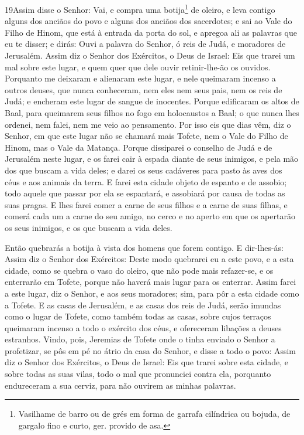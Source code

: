 \medskip

\lettrine{19} Assim disse o Senhor: Vai, e compra uma
botija\footnote{Vasilhame de barro ou de grés em forma de garrafa
cilíndrica ou bojuda, de gargalo fino e curto, ger. provido de asa.}
de oleiro, e leva contigo alguns dos anciãos do povo e alguns dos
anciãos dos sacerdotes; e sai ao Vale do Filho de Hinom, que
está à entrada da porta do sol, e apregoa ali as palavras que eu te
disser; e dirás: Ouvi a palavra do Senhor, ó reis de Judá, e
moradores de Jerusalém. Assim diz o Senhor dos Exércitos, o Deus de
Israel: Eis que trarei um mal sobre este lugar, e quem quer que dele
ouvir retinir-lhe-ão os ouvidos. Porquanto me deixaram e
alienaram este lugar, e nele queimaram incenso a outros deuses, que
nunca conheceram, nem eles nem seus pais, nem os reis de Judá; e
encheram este lugar de sangue de inocentes. Porque edificaram os
altos de Baal, para queimarem seus filhos no fogo em holocaustos a
Baal; o que nunca lhes ordenei, nem falei, nem me veio ao
pensamento. Por isso eis que dias vêm, diz o Senhor, em que este
lugar não se chamará mais Tofete, nem o Vale do Filho de Hinom, mas
o Vale da Matança. Porque dissiparei o conselho de Judá e de
Jerusalém neste lugar, e os farei cair à espada diante de seus
inimigos, e pela mão dos que buscam a vida deles; e darei os seus
cadáveres para pasto às aves dos céus e aos animais da terra. E
farei esta cidade objeto de espanto e de assobio; todo aquele que
passar por ela se espantará, e assobiará por causa de todas as suas
pragas. E lhes farei comer a carne de seus filhos e a carne de
suas filhas, e comerá cada um a carne do seu amigo, no cerco e no
aperto em que os apertarão os seus inimigos, e os que buscam a vida
deles.

Então quebrarás a botija à vista dos homens que forem contigo.
E dir-lhes-ás: Assim diz o Senhor dos Exércitos: Deste modo
quebrarei eu a este povo, e a esta cidade, como se quebra o vaso do
oleiro, que não pode mais refazer-se, e os enterrarão em Tofete,
porque não haverá mais lugar para os enterrar. Assim farei a
este lugar, diz o Senhor, e aos seus moradores; sim, para pôr a esta
cidade como a Tofete. E as casas de Jerusalém, e as casas dos
reis de Judá, serão imundas como o lugar de Tofete, como também
todas as casas, sobre cujos terraços queimaram incenso a todo o
exército dos céus, e ofereceram libações a deuses estranhos.
Vindo, pois, Jeremias de Tofete onde o tinha enviado o Senhor
a profetizar, se pôs em pé no átrio da casa do Senhor, e disse a
todo o povo: Assim diz o Senhor dos Exércitos, o Deus de
Israel: Eis que trarei sobre esta cidade, e sobre todas as suas
vilas, todo o mal que pronunciei contra ela, porquanto endureceram a
sua cerviz, para não ouvirem as minhas palavras.

